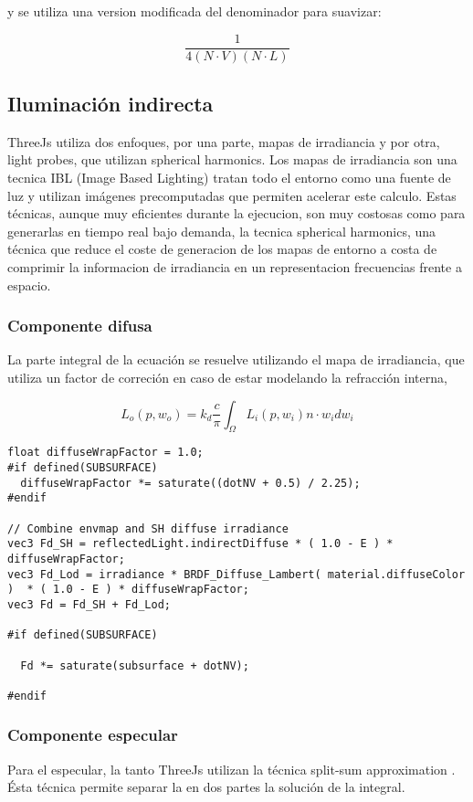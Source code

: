   y se utiliza una version modificada del denominador para suavizar:

  \begin{equation}
  \frac{1}{4(N\cdot{V})(N\cdot{L})}
  \end{equation}
  \singlespacing

  \subsection{Iluminaci\'on indirecta}
    ThreeJs utiliza dos enfoques, por una parte, mapas de irradiancia y por otra, light probes, que
    utilizan spherical harmonics. Los mapas de irradiancia son una tecnica IBL (Image Based Lighting)
    tratan todo el entorno como una fuente de luz y utilizan im\'agenes precomputadas que permiten
    acelerar este calculo. Estas t\'ecnicas, aunque muy eficientes durante la ejecucion, son muy
    costosas como para generarlas en tiempo real bajo demanda, la tecnica spherical harmonics, una
    t\'ecnica que reduce el coste de generacion de los mapas de entorno a costa de comprimir la
    informacion de irradiancia en un representacion frecuencias frente a espacio.

    \subsubsection{Componente difusa}
      La parte integral de la ecuaci\'on se resuelve utilizando el mapa de irradiancia,
      que utiliza un factor de correci\'on en caso de estar modelando la refracci\'on interna,

      $$
      L_o(p, w_o) = k_d \frac{c}{\pi} \int_{\Omega}{L_i(p, w_i) n\cdot{w_i}dw_i}{}
      $$

      \begin{lstlisting}
float diffuseWrapFactor = 1.0;
#if defined(SUBSURFACE)
  diffuseWrapFactor *= saturate((dotNV + 0.5) / 2.25);
#endif

// Combine envmap and SH diffuse irradiance
vec3 Fd_SH = reflectedLight.indirectDiffuse * ( 1.0 - E ) * diffuseWrapFactor;
vec3 Fd_Lod = irradiance * BRDF_Diffuse_Lambert( material.diffuseColor )  * ( 1.0 - E ) * diffuseWrapFactor;
vec3 Fd = Fd_SH + Fd_Lod;

#if defined(SUBSURFACE)

  Fd *= saturate(subsurface + dotNV);

#endif
      \end{lstlisting}
      \singlespacing

    \subsubsection{Componente especular}
    \bgroup
      Para el especular, la tanto ThreeJs utilizan la t\'ecnica split-sum approximation
      \autocite{splitsum}. \'Esta t\'ecnica permite separar la en dos partes la soluci\'on de la
      integral.

